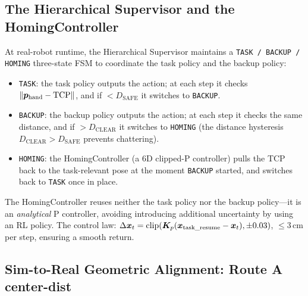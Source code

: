\subsection{The Hierarchical Supervisor and the HomingController}\label{subsec:supervisor}

At real-robot runtime, the Hierarchical Supervisor maintains a \texttt{TASK / BACKUP / HOMING} three-state FSM to coordinate the task policy and the backup policy:

\begin{itemize}
  \item \texttt{TASK}: the task policy outputs the action; at each step it checks $\lVert \bm{p}_\text{hand} - \text{TCP}\rVert$, and if $< D_\text{SAFE}$ it switches to \texttt{BACKUP}.
  \item \texttt{BACKUP}: the backup policy outputs the action; at each step it checks the same distance, and if $> D_\text{CLEAR}$ it switches to \texttt{HOMING} (the distance hysteresis $D_\text{CLEAR} > D_\text{SAFE}$ prevents chattering).
  \item \texttt{HOMING}: the HomingController (a 6D clipped-P controller) pulls the TCP back to the task-relevant pose at the moment \texttt{BACKUP} started, and switches back to \texttt{TASK} once in place.
\end{itemize}

The HomingController reuses neither the task policy nor the backup policy---it is an \emph{analytical} P controller, avoiding introducing additional uncertainty by using an RL policy. The control law: $\Delta\bm{x}_t = \mathrm{clip}(\bm{K}_p (\bm{x}_\text{task\_resume} - \bm{x}_t), \pm 0.03)$, $\leq 3$\,cm per step, ensuring a smooth return.

\subsection{Sim-to-Real Geometric Alignment: Route A center-dist}\label{subsec:route_a}

